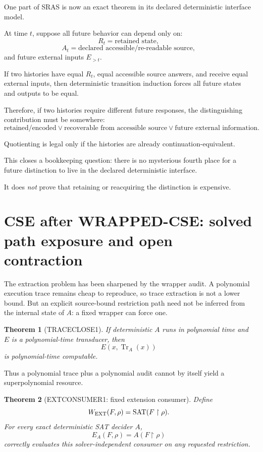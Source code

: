 \documentclass[11pt]{article}
\theoremstyle{plain}
\newtheorem{theorem}{Theorem}[section]
\theoremstyle{definition}
\theoremstyle{remark}
\begin{document}
One part of SRAS is now an exact theorem in its declared deterministic
interface model.

At time \(t\), suppose all future behavior can depend only on:
\[
R_t=\text{retained state},
\]
\[
A_t=\text{declared accessible/re-readable source},
\]
and future external inputs \(E_{>t}\).

If two histories have equal \(R_t\), equal accessible source answers, and
receive equal external inputs, then deterministic transition induction forces
all future states and outputs to be equal.

Therefore, if two histories require different future responses, the
distinguishing contribution must be somewhere:
\[
\boxed{
\text{retained/encoded}
\vee
\text{recoverable from accessible source}
\vee
\text{future external information}.
}
\]

Quotienting is legal only if the histories are already continuation-equivalent.

\begin{provedbox}
This closes a bookkeeping question: there is no mysterious fourth place for a
future distinction to live in the declared deterministic interface.

It does \emph{not} prove that retaining or reacquiring the distinction is
expensive.
\end{provedbox}

\section{CSE after WRAPPED-CSE: solved path exposure and open contraction}

The extraction problem has been sharpened by the wrapper audit.  A polynomial
execution trace remains cheap to reproduce, so trace extraction is not a
lower bound.  But an explicit source-bound restriction path need not be
inferred from the internal state of \(A\): a fixed wrapper can force one.

\begin{theorem}[TRACECLOSE1]
If deterministic \(A\) runs in polynomial time and \(E\) is a polynomial-time
transducer, then
\[
E(x,\operatorname{Tr}_A(x))
\]
is polynomial-time computable.
\end{theorem}

Thus a polynomial trace plus a polynomial audit cannot by itself yield a
superpolynomial resource.

\begin{theorem}[EXTCONSUMER1: fixed extension consumer]
Define
\[
W_{\rm EXT}(F,\rho)
=
\operatorname{SAT}(F\upharpoonright\rho).
\]
For every exact deterministic SAT decider \(A\),
\[
E_A(F,\rho)=A(F\upharpoonright\rho)
\]
correctly evaluates this solver-independent consumer on any requested
restriction.
\end{theorem}
\end{document}
